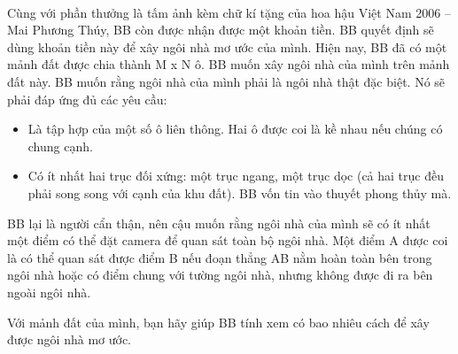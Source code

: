  

Cùng với phần thưởng là tấm ảnh kèm chữ kí tặng của hoa hậu Việt Nam 2006 – Mai Phương Thúy, BB còn được nhận được một khoản tiền. BB quyết định sẽ dùng khoản tiền này để xây ngôi nhà mơ ước của mình. Hiện nay, BB đã có một mảnh đất được chia thành M x N ô. BB muốn xây ngôi nhà của mình trên mảnh đất này. BB muốn rằng ngôi nhà của mình phải là ngôi nhà thật đặc biệt. Nó sẽ phải đáp ứng đủ các yêu cầu:
\begin{itemize}
	\item Là tập hợp của một số ô liên thông. Hai ô được coi là kề nhau nếu chúng có chung cạnh.
	\item Có ít nhất hai trục đối xứng: một trục ngang, một trục dọc (cả hai trục đều phải song song với cạnh của khu đất). BB vốn tin vào thuyết phong thủy mà.
\end{itemize}

BB lại là người cẩn thận, nên cậu muốn rằng ngôi nhà của mình sẽ có ít nhất một điểm có thể đặt camera để quan sát toàn bộ ngôi nhà. Một điểm A được coi là có thể quan sát được điểm B nếu đoạn thẳng AB nằm hoàn toàn bên trong ngôi nhà hoặc có điểm chung với tường ngôi nhà, nhưng không được đi ra bên ngoài ngôi nhà.

Với mảnh đất của mình, bạn hãy giúp BB tính xem có bao nhiêu cách để xây được ngôi nhà mơ ước.